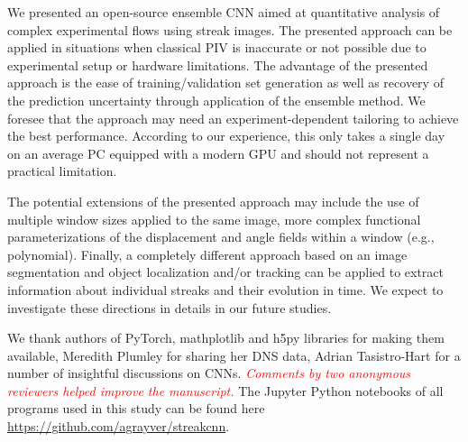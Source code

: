 \documentclass{svjour3}                     %
\newcommand{\new}[1]{\textit{\textcolor{red}{#1}}}
\begin{document}
We presented an open-source ensemble CNN aimed at quantitative analysis of complex experimental flows using streak images. The presented approach can be applied in situations when classical PIV is inaccurate or not possible due to experimental setup or hardware limitations. The advantage of the presented approach is the ease of training/validation set generation as well as recovery of the prediction uncertainty through application of the ensemble method. We foresee that the approach may need an experiment-dependent tailoring to achieve the best performance. According to our experience, this only takes a single day on an average PC equipped with a modern GPU and should not represent a practical limitation.

The potential extensions of the presented approach may include the use of multiple window sizes applied to the same image, more complex functional parameterizations of the displacement and angle fields within a window (e.g., polynomial). Finally, a completely different approach based on an image segmentation and object localization and/or tracking can be applied to extract information about individual streaks and their evolution in time. We expect to investigate these directions in details in our future studies.

\begin{acknowledgements}
We thank authors of PyTorch, mathplotlib and h5py libraries for making them available, Meredith Plumley for sharing her DNS data, Adrian Tasistro-Hart for a number of insightful discussions on CNNs. \new{Comments by two anonymous reviewers helped improve the manuscript.} The Jupyter Python notebooks of all programs used in this study can be found here \url{https://github.com/agrayver/streakcnn}.
\end{acknowledgements}

%
\end{document}
